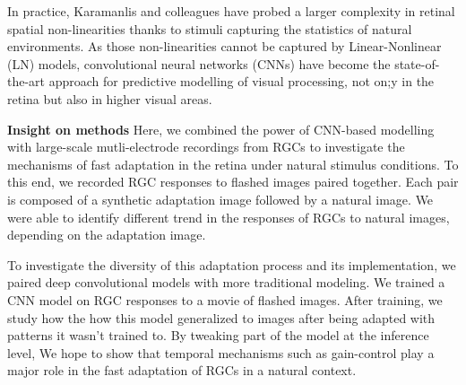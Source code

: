 
In practice, Karamanlis and colleagues \citep{kim_nonlinear_2020} have
probed a larger complexity in retinal spatial non-linearities thanks to stimuli
capturing the statistics of natural environments.
As those non-linearities cannot be captured by Linear-Nonlinear (LN) models,
convolutional neural networks (CNNs) have become the state-of-the-art approach
for predictive modelling of visual processing, not on;y in the retina but also
in higher visual areas. %

\textbf{Insight on methods}
Here, we combined the power of CNN-based modelling with large-scale
mutli-electrode recordings from RGCs to investigate the mechanisms of fast
adaptation in the retina under natural stimulus conditions. To this end, we
recorded RGC responses to flashed images paired together. Each pair is composed
of a synthetic adaptation image followed by a natural image. We were able to
identify different trend in the responses of RGCs to natural images, depending
on the adaptation image.

To investigate the diversity of this adaptation process and its implementation,
we paired deep convolutional models with more traditional modeling. We trained
a CNN model on RGC responses to a movie of flashed images. After training, we
study how the how this model generalized to images after being adapted with
patterns it wasn't trained to. By tweaking part of the model at the inference
level, We hope to show that temporal mechanisms such as gain-control play a
major role in the fast adaptation of RGCs in a natural context.